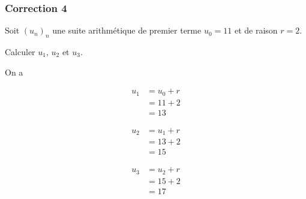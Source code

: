 \documentclass[15pt, mathserif]{beamer}
\begin{document}
\begin{frame}
\vspace{-10mm}
	\frametitle{Correction 4}
Soit $(u_n)_n$ une suite arithmétique de premier terme $u_0=11$ et de raison $r=2$. 
 
 Calculer $u_1$, $u_2$ et $u_3$. 
 
 On a 
 \begin{minipage}{0.25\textwidth} 
 
 \begin{align*} 
 u_1 &= u_0+r \\ &= 11+2 \\ &=13
 \end{align*} 
  
 \end{minipage} \hfil \begin{minipage}{0.25\textwidth} 
 
 \begin{align*} 
 u_2 &= u_1+r \\ &= 13+2 \\ &=15
 \end{align*} 
 
 \end{minipage} \hfil \begin{minipage}{0.25\textwidth} 
 
 \begin{align*} 
 u_3 &= u_2+r \\ &= 15+2 \\ &=17
 \end{align*} 
 
 \end{minipage} 
\end{frame}
\end{document}
